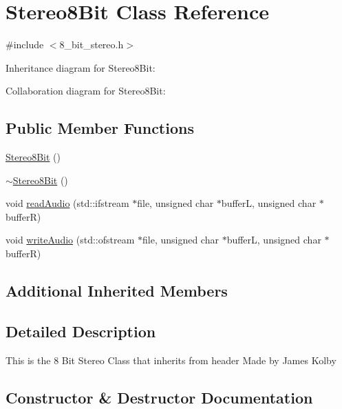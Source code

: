 \hypertarget{classStereo8Bit}{}\section{Stereo8\+Bit Class Reference}
\label{classStereo8Bit}


{\ttfamily \#include $<$8\+\_\+bit\+\_\+stereo.\+h$>$}



Inheritance diagram for Stereo8\+Bit\+:


Collaboration diagram for Stereo8\+Bit\+:
\subsection*{Public Member Functions}
\begin{DoxyCompactItemize}
\item 
\hyperlink{classStereo8Bit_a7dd16a65c190a5cfa7daa449a2cc2366}{Stereo8\+Bit} ()
\item 
\hyperlink{classStereo8Bit_aad4ea9258c6313243c7d56b34e8894da}{$\sim$\+Stereo8\+Bit} ()
\item 
void \hyperlink{classStereo8Bit_ab636dffdbabac3c7d3bf1bbeebbd736e}{read\+Audio} (std\+::ifstream $\ast$file, unsigned char $\ast$bufferL, unsigned char $\ast$bufferR)
\item 
void \hyperlink{classStereo8Bit_ad181941f5da5effbfb38d73bf7005e54}{write\+Audio} (std\+::ofstream $\ast$file, unsigned char $\ast$bufferL, unsigned char $\ast$bufferR)
\end{DoxyCompactItemize}
\subsection*{Additional Inherited Members}


\subsection{Detailed Description}
This is the 8 Bit Stereo Class that inherits from header Made by James Kolby 

\subsection{Constructor \& Destructor Documentation}
\mbox{\label{classStereo8Bit_a7dd16a65c190a5cfa7daa449a2cc2366}} 
